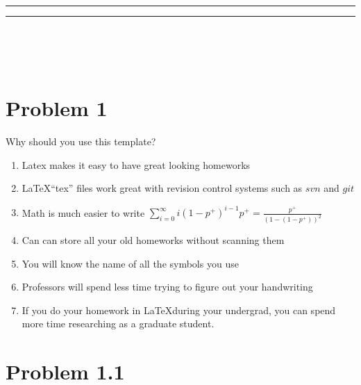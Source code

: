 \documentclass[12pt,letterpaper]{article}
\begin{document}
\begin{titlepage}
\begin{center}
\textsc{\LARGE \university}\vspace{10mm}
\hrule\vspace{2mm}
\huge\bfseries\thetitle\vspace{2mm}
\hrule\vspace{10mm}
\end{center}
\begin{flushleft}
\textbf\theauthor\\
\studentid\\
\email\\
\end{flushleft}
\vfill
\begin{center}
\thedate
\end{center}
\end{titlepage}
\newpage



\section*{Problem 1}

Why should you use this template?

\begin{enumerate}
  \item Latex makes it easy to have great looking homeworks
  \item \LaTeX ``tex'' files work great with revision control systems such as
  $svn$ and $git$
  \item Math is much easier to write $\displaystyle\sum_{i=0}^\infty
  i(1-p^+)^{i-1}p^+ = \frac{p^+}{(1-(1-p^+))^2}$
  \item Can can store all your old homeworks without scanning them
  \item You will know the name of all the symbols you use
  \item Professors will spend less time trying to figure out your handwriting
  \item If you do your homework in \LaTeX during your undergrad, you can spend
  more time researching as a graduate student.
\end{enumerate}

\section*{Problem 1.1}
\end{document}

